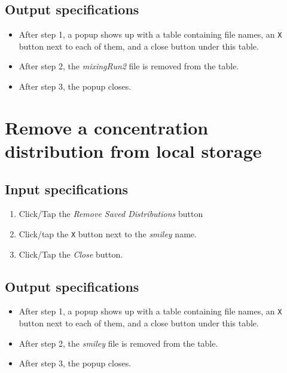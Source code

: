 \subsection*{Output specifications}
\begin{itemize}
\item After step 1, a popup shows up with a table containing file names, an \texttt{X} button next to each of them, and a close button under this table.
\item After step 2, the \emph{mixingRun2} file is removed from the table.
\item After step 3, the popup closes.
\end{itemize}

\section{Remove a concentration distribution from local storage}

\subsection*{Input specifications}
\begin{enumerate}
\item Click/Tap the \emph{Remove Saved Distributions} button
\item Click/tap the \texttt{X} button next to the \emph{smiley} name.
\item Click/Tap the \emph{Close} button.
\end{enumerate}

\subsection*{Output specifications}
\begin{itemize}
\item After step 1, a popup shows up with a table containing file names, an \texttt{X} button next to each of them, and a close button under this table.
\item After step 2, the \emph{smiley} file is removed from the table.
\item After step 3, the popup closes.
\end{itemize}

